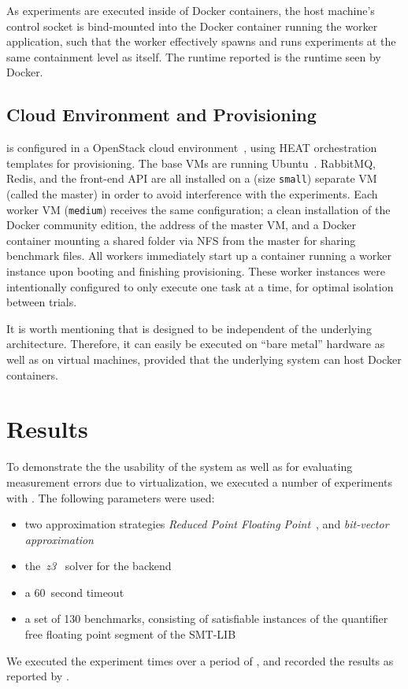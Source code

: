 \documentclass[a4paper]{IEEEtran}
\begin{document}
As experiments are executed inside of Docker containers, the host machine's
control socket is bind-mounted into the Docker container running the worker
application, such that the worker effectively spawns and runs experiments at the
same containment level as itself. The runtime reported is the runtime seen by
Docker.

\subsection{Cloud Environment and Provisioning}

\testbench{} is configured in a OpenStack cloud environment~\cite{openstack},
using HEAT orchestration templates for provisioning. The base VMs are running
Ubuntu~. RabbitMQ, Redis, and the front-end API are all installed
on a (size \texttt{small}) separate VM (called the master) in order to avoid
interference with the experiments. Each worker VM (\texttt{medium}) receives the
same configuration; a clean installation of the Docker community edition, the
address of the master VM, and a Docker container mounting a shared folder via
NFS from the master for sharing benchmark files. All workers immediately start
up a container running a worker instance upon booting and finishing
provisioning. These worker instances were intentionally configured to only
execute one task at a time, for optimal isolation between trials.

It is worth mentioning that \testbench{} is designed to be independent of the
underlying architecture. Therefore, it can easily be executed on ``bare metal''
hardware as well as on virtual machines, provided that the underlying system can
host Docker containers.

\section{Results}
To demonstrate the the usability of the system as well as for evaluating
measurement errors due to virtualization, we executed a number of experiments
with \testbench{}. The following parameters were used:
\begin{itemize}
\item two approximation strategies \emph{Reduced Point
  Floating Point}~\cite{uppsat}, and \emph{bit-vector
  approximation}~\cite{joel}

\item the~\emph{z3}~\cite{z3} solver for the backend

\item a 60~second timeout

\item a set of 130 benchmarks, consisting of satisfiable instances of the
  quantifier free floating point segment of the SMT-LIB~\cite{smtlib}
\end{itemize}
We executed the experiment  times over a period of
, and recorded the results as reported by \testbench{}.
\end{document}
